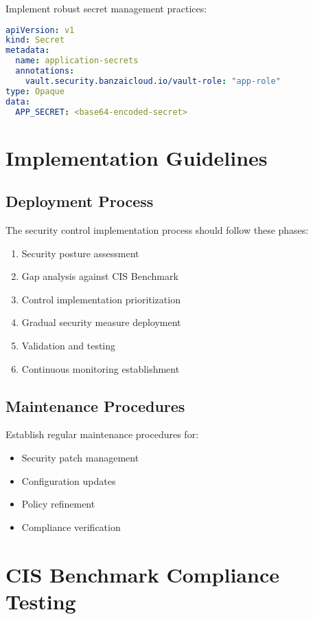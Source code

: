 \documentclass[PMO,lsstdraft,authoryear,toc]{lsstdoc}
\begin{document}
Implement robust secret management practices:

\begin{lstlisting}[language=yaml]
apiVersion: v1
kind: Secret
metadata:
  name: application-secrets
  annotations:
    vault.security.banzaicloud.io/vault-role: "app-role"
type: Opaque
data:
  APP_SECRET: <base64-encoded-secret>
\end{lstlisting}

\section{Implementation Guidelines}

\subsection{Deployment Process}

The security control implementation process should follow these phases:

\begin{enumerate}
    \item Security posture assessment
    \item Gap analysis against CIS Benchmark
    \item Control implementation prioritization
    \item Gradual security measure deployment
    \item Validation and testing
    \item Continuous monitoring establishment
\end{enumerate}

\subsection{Maintenance Procedures}

Establish regular maintenance procedures for:

\begin{itemize}
    \item Security patch management
    \item Configuration updates
    \item Policy refinement
    \item Compliance verification
\end{itemize}

\section{CIS Benchmark Compliance Testing}
\end{document}
